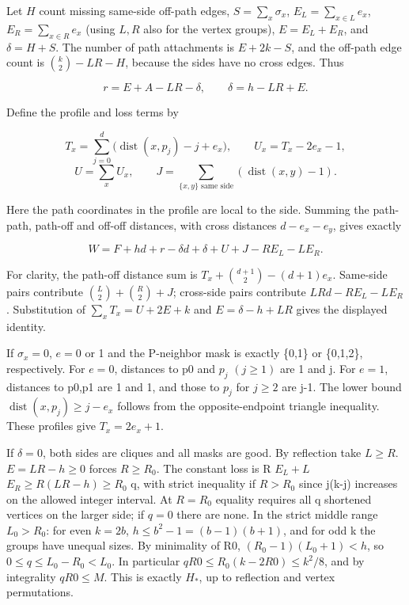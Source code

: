 \documentclass[
  11pt,
]{article}
\begin{document}
Let \(H\) count missing same-side off-path edges, \(S=\sum_x\sigma_x\),
\(E_L=\sum_{x\in L}e_x\), \(E_R=\sum_{x\in R}e_x\) (using \(L,R\) also
for the vertex groups), \(E=E_L+E_R\), and \(\delta=H+S\). The number of
path attachments is \(E+2k-S\), and the off-path edge count is
\(\binom{k}{2}-LR-H\), because the sides have no cross edges. Thus

\[r=E+A-LR-\delta,\qquad \delta=h-LR+E.\]

Define the profile and loss terms by

\[T_x=\sum_{j=0}^d\bigl(\operatorname{dist}(x,p_j)-j+e_x\bigr),\qquad U_x=T_x-2e_x-1,\]
\[U=\sum_x U_x,\qquad J=\sum_{\{x,y\}\text{ same side}}(\operatorname{dist}(x,y)-1).\]

Here the path coordinates in the profile are local to the side. Summing
the path-path, path-off and off-off distances, with cross distances
\(d-e_x-e_y\), gives exactly

\[W=F+hd+r-\delta d+\delta+U+J-R E_L-L E_R.\]

For clarity, the path-off distance sum is
\(T_x+\binom{d+1}{2}-(d+1)e_x\). Same-side pairs contribute
\(\binom L2+\binom R2+J\); cross-side pairs contribute
\(LRd-RE_L-LE_R\). Substitution of \(\sum_xT_x=U+2E+k\) and
\(E=\delta-h+LR\) gives the displayed identity.

If \(\sigma _{x}=0\), \(e=0\) or 1 and the P-neighbor mask is exactly
\{0,1\} or \{0,1,2\}, respectively. For \(e=0\), distances to p0 and
\(p_{j}\) \((j\ge 1)\) are 1 and j. For \(e=1\), distances to p0,p1 are
1 and 1, and those to \(p_{j}\) for \(j\ge 2\) are j-1. The lower bound
\(\operatorname{dist}(x,p_{j})\ge j-e_{x}\) follows from the
opposite-endpoint triangle inequality. These profiles give
\(T_{x}=2e_{x}+1\).

If \(\delta =0\), both sides are cliques and all masks are good. By
reflection take \(L\ge R\). \(E=LR-h\ge 0\) forces \(R\ge R_0\). The
constant loss is R \(E_{L}+L\) \(E_{R}\ge R(LR-h)\ge R_0\) q, with
strict inequality if \(R>R_0\) since j(k-j) increases on the allowed
integer interval. At \(R=R_0\) equality requires all q shortened
vertices on the larger side; if \(q=0\) there are none. In the strict
middle range \(L_0>R_0\): for even \(k=2b\), \(h\le b^2-1=(b-1)(b+1)\),
and for odd k the groups have unequal sizes. By minimality of R0,
\((R_0-1)(L_0+1)<h\), so \(0\le q\le L_0-R_0<L_0\). In particular
\(qR0\le R_0(k-2R0)\le k^2/8\), and by integrality \(qR0\le M\). This is
exactly \(H_*\), up to reflection and vertex permutations.
\end{document}
